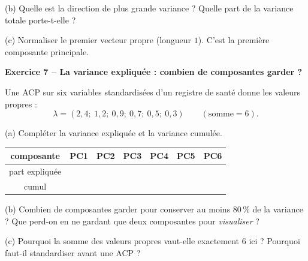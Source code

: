 \documentclass[10pt,a4paper]{article}
\newcommand{\repligne}{\par\vspace{0.42cm}\noindent\dotfill}
\newcommand{\zonecalcul}[1]{\par\vspace{0.15cm}\noindent{\small\emph{Espace de calcul :}}\par\vspace{#1}}
\begin{document}
\vspace{0.15cm}
(b) Quelle est la direction de plus grande variance ? Quelle part de la variance totale porte-t-elle ?
\zonecalcul{0.7cm}
\repligne

\vspace{0.15cm}
(c) Normaliser le premier vecteur propre (longueur $1$). C'est la première composante principale.
\repligne

\vspace{0.45cm}
\textbf{\large Exercice 7 -- La variance expliquée : combien de composantes garder ?}
\vspace{0.15cm}

Une ACP sur six variables standardisées d'un registre de santé donne les valeurs propres :
\[ \lambda = (2{,}4;\ 1{,}2;\ 0{,}9;\ 0{,}7;\ 0{,}5;\ 0{,}3) \qquad (\text{somme} = 6). \]

(a) Compléter la variance expliquée et la variance cumulée.

\vspace{0.1cm}
{\small \renewcommand{\arraystretch}{1.8}\begin{tabular}{|c|c|c|c|c|c|c|}\hline
composante & PC1 & PC2 & PC3 & PC4 & PC5 & PC6\\\hline
part expliquée & & & & & & \\\hline
cumul & & & & & & \\\hline
\end{tabular}}

\vspace{0.15cm}
(b) Combien de composantes garder pour conserver au moins $80\,\%$ de la variance ? Que perd-on en ne gardant que deux composantes pour \emph{visualiser} ?
\repligne\repligne

\vspace{0.15cm}
(c) Pourquoi la somme des valeurs propres vaut-elle exactement $6$ ici ? Pourquoi faut-il standardiser avant une ACP ?
\repligne\repligne
\end{document}
